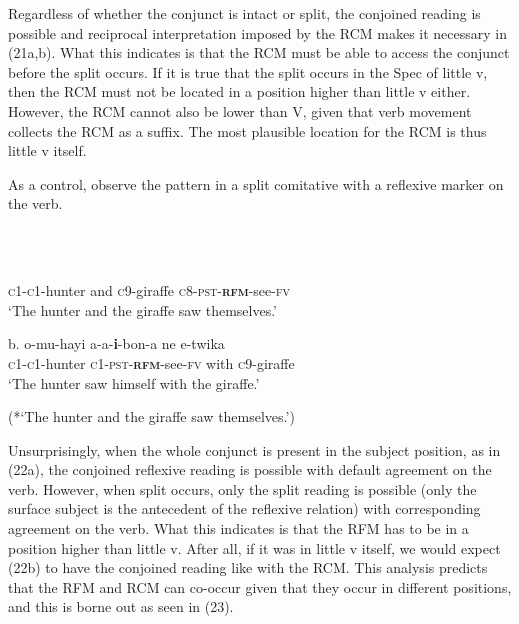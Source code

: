 Regardless of whether the conjunct is intact or split, the conjoined reading is possible and reciprocal interpretation imposed by the RCM makes it necessary in (21a,b). What this indicates is that the RCM must be able to access the conjunct before the split occurs. If it is true that the split occurs in the Spec of little v, then the RCM must not be located in a position higher than little v either. However, the RCM cannot also be lower than V, given that verb movement collects the RCM as a suffix. The most plausible location for the RCM is thus little v itself. 

  As a control, observe the pattern in a split comitative with a reflexive marker on the verb. 

\begin{listWWviiiNumxlileveli}
\item \ea\label{ex:}
\\
\ea\label{ex:}
\\
\end{listWWviiiNumxlileveli}
       \textsc{c1-c1}{}-hunter   and   \textsc{c}9-giraffe   \textsc{c}8-\textsc{pst-}\textbf{\textsc{rfm}}{}-see-\textsc{fv} \\
\glt   ‘The hunter and the giraffe saw themselves.’
\z

\gll \textup{b.  }o-mu-hayi   a-a-\textbf{i}{}-bon-a     ne   e-twika \\
       \textsc{c1-c1}{}-hunter  \textsc{c}1-\textsc{pst-}\textbf{\textsc{rfm}}{}-see-\textsc{fv}   with   \textsc{c}9-giraffe \\
\glt   ‘The hunter saw himself with the giraffe.’
\z

\glt   (*‘The hunter and the giraffe saw themselves.’)
\z

Unsurprisingly, when the whole conjunct is present in the subject position, as in (22a), the conjoined reflexive reading is possible with default agreement on the verb. However, when split occurs, only the split reading is possible (only the surface subject is the antecedent of the reflexive relation) with corresponding agreement on the verb. What this indicates is that the RFM has to be in a position higher than little v. After all, if it was in little v itself, we would expect (22b) to have the conjoined reading like with the RCM. This analysis predicts that the RFM and RCM can co-occur given that they occur in different positions, and this is borne out as seen in (23).

